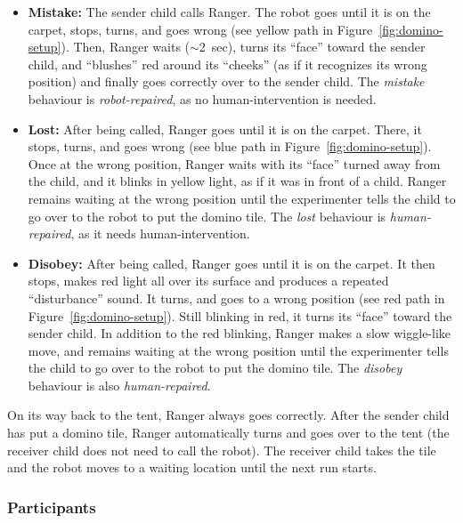 \documentclass{sig-alternate}
\begin{document}
\begin{itemize}	

    \item \textbf{Mistake:} The sender child calls Ranger. The robot goes until
    it is on the carpet, stops, turns, and goes wrong (see yellow path in
    Figure~\ref{fig:domino-setup}). Then, Ranger waits ($\sim$2~sec), turns its
    ``face'' toward the sender child, and ``blushes'' red around its ``cheeks''
    (as if it recognizes its wrong position) and finally goes correctly over to
    the sender child. The \textit{mistake} behaviour is \textit{robot-repaired},
    as no human-intervention is needed.

    \item \textbf{Lost:} After being called, Ranger goes until it is on the
    carpet. There, it stops, turns, and goes wrong (see blue path in
    Figure~\ref{fig:domino-setup}). Once at the wrong position, Ranger waits
    with its ``face'' turned away from the child, and it blinks in yellow light,
    as if it was in front of a child. Ranger remains waiting at the wrong
    position until the experimenter tells the child to go over to the robot to
    put the domino tile. The \textit{lost} behaviour is \textit{human-repaired},
    as it needs human-intervention.

    \item \textbf{Disobey:} After being called, Ranger goes until it is on the
    carpet. It then stops, makes red
    light all over its surface and produces a repeated ``disturbance'' sound. It
    turns, and goes to a wrong position (see red path in
    Figure~\ref{fig:domino-setup}). Still blinking in red, it turns its ``face''
    toward the sender child. In addition to the red blinking, Ranger
    makes a slow wiggle-like move, and remains waiting at the wrong position
    until the experimenter tells the child to go over to the robot to put the
    domino tile. The \textit{disobey} behaviour is also \textit{human-repaired}.	

\end{itemize}

On its way back to the tent, Ranger always goes correctly. After the sender
child has put a domino tile, Ranger automatically turns and goes over to the
tent (the receiver child does not need to call the robot). The receiver child
takes the tile and the robot moves to a waiting location until the next run
starts.


\subsubsection{Participants}
\end{document}
